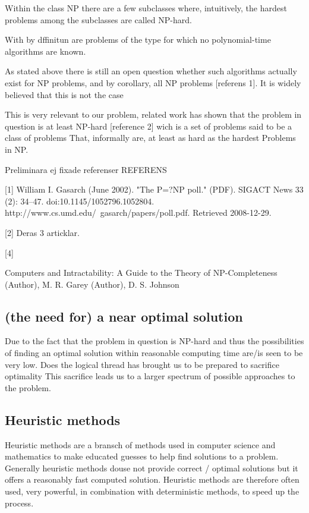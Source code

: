 Within the class NP there are a few subclasses where, intuitively, the hardest problems among the subclasses are called NP-hard.

With by dffinitun are problems of the type for which no polynomial-time algorithms are known. 

As stated above there is still an open question whether such algorithms actually exist for NP problems, and by corollary, all NP problems [referens 1]. It is widely believed that this is not the case 

This is very relevant to our problem, related work has shown that the problem in question is at least NP-hard [reference 2] wich is a set of problems said to be a class of problems That, informally are, at least as hard as the hardest Problems in NP.




Preliminara ej fixade referenser 
REFERENS 

[1]
William I. Gasarch (June 2002). "The P=?NP poll." (PDF). SIGACT News 33 (2): 34–47. doi:10.1145/1052796.1052804. http://www.cs.umd.edu/~gasarch/papers/poll.pdf. Retrieved 2008-12-29.

[2] 
Deras 3 articklar.


[4]

Computers and Intractability: A Guide to the Theory of NP-Completeness  (Author),  M. R. Garey (Author), D. S. Johnson


\subsection{(the need for) a near optimal solution}

Due to the fact that the problem in question is NP-hard and thus the possibilities of finding an optimal solution within reasonable computing time are/is seen to be very low. Does the logical thread has brought us to be prepared to sacrifice optimality
This sacrifice leads us to a larger spectrum of possible approaches to the problem.

\subsection{Heuristic methods}

Heuristic methods are a bransch of methods used in computer science and mathematics to make educated guesses to help find solutions to a problem. Generally heuristic methods douse not provide correct / optimal solutions but it offers a reasonably fast computed solution. Heuristic methods are therefore often used, very powerful, in combination with deterministic methods, to speed up the process.

